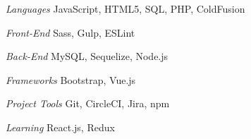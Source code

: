 \begin{minipage}[t]{0.53\textwidth}
\begin{cvskills}

  \cvskill
    {\textit{Languages}} %
    {JavaScript, HTML5, SQL, PHP, ColdFusion} %


 \cvskill
    {\textit{Front-End}} %
    {Sass, Gulp, ESLint} %


  \cvskill
    {\textit{Back-End}} %
    {MySQL, Sequelize, Node.js} %

 
\end{cvskills}
\end{minipage}%
\begin{minipage}[t]{0.47\textwidth}
\begin{cvskills}

  \cvskill
    {\textit{Frameworks}} %
    {Bootstrap, Vue.js} %


  \cvskill
    {\textit{Project Tools}} %
    {Git, CircleCI, Jira, npm} %


  \cvskill
    {\textit{Learning}} %
    {React.js, Redux} %

\end{cvskills}
\end{minipage}

%

